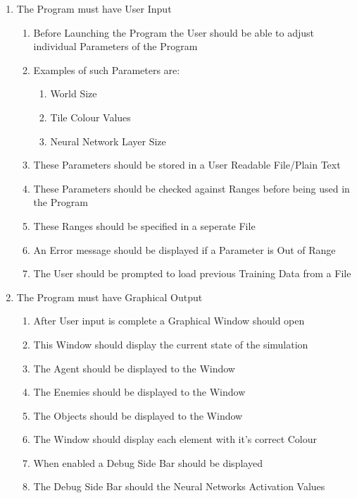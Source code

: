 \begin{flushleft}
            \begin{enumerate}
                \item The Program must have User Input
                \begin{enumerate}
                    \item Before Launching the Program the User should be able to adjust individual Parameters of the Program
                    \item Examples of such Parameters are:
                    \begin{enumerate}
                        \item World Size
                        \item Tile Colour Values
                        \item Neural Network Layer Size
                    \end{enumerate}
                    \item These Parameters should be stored in a User Readable File/Plain Text
                    \item These Parameters should be checked against Ranges before being used in the Program
                    \item These Ranges should be specified in a seperate File
                    \item An Error message should be displayed if a Parameter is Out of Range
                    \item The User should be prompted to load previous Training Data from a File
                \end{enumerate}

                \item The Program must have Graphical Output
                \begin{enumerate}
                    \item After User input is complete a Graphical Window should open
                    \item This Window should display the current state of the simulation
                    \item The Agent should be displayed to the Window
                    \item The Enemies should be displayed to the Window
                    \item The Objects should be displayed to the Window
                    \item The Window should display each element with it's correct Colour
                    \item When enabled a Debug Side Bar should be displayed
                    \item The Debug Side Bar should the Neural Networks Activation Values
                \end{enumerate}


\end{enumerate}
\end{flushleft}
